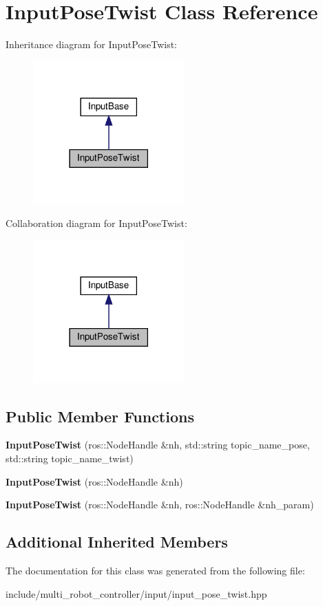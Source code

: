 \hypertarget{classInputPoseTwist}{}\section{Input\+Pose\+Twist Class Reference}
\label{classInputPoseTwist}


Inheritance diagram for Input\+Pose\+Twist\+:\nopagebreak
\begin{figure}[H]
\begin{center}
\leavevmode
\includegraphics[width=165pt]{d7/d11/classInputPoseTwist__inherit__graph}
\end{center}
\end{figure}


Collaboration diagram for Input\+Pose\+Twist\+:\nopagebreak
\begin{figure}[H]
\begin{center}
\leavevmode
\includegraphics[width=165pt]{d6/d3a/classInputPoseTwist__coll__graph}
\end{center}
\end{figure}
\subsection*{Public Member Functions}
\begin{DoxyCompactItemize}
\item 
{\bfseries Input\+Pose\+Twist} (ros\+::\+Node\+Handle \&nh, std\+::string topic\+\_\+name\+\_\+pose, std\+::string topic\+\_\+name\+\_\+twist)
\item 
{\bfseries Input\+Pose\+Twist} (ros\+::\+Node\+Handle \&nh)
\item 
{\bfseries Input\+Pose\+Twist} (ros\+::\+Node\+Handle \&nh, ros\+::\+Node\+Handle \&nh\+\_\+param)
\end{DoxyCompactItemize}
\subsection*{Additional Inherited Members}


The documentation for this class was generated from the following file\+:\begin{DoxyCompactItemize}
\item 
include/multi\+\_\+robot\+\_\+controller/input/input\+\_\+pose\+\_\+twist.\+hpp\end{DoxyCompactItemize}
